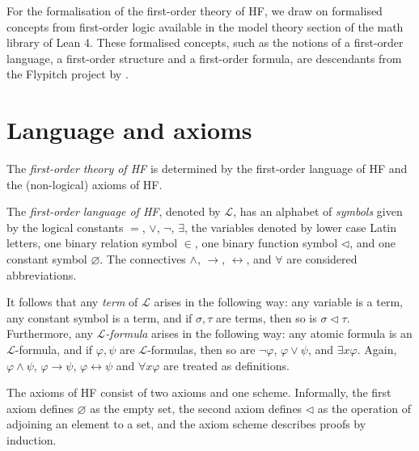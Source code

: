 For the formalisation of the first-order theory of HF,
we draw on formalised concepts from first-order logic available in 
the model theory section of the math library of Lean 4.
These formalised concepts, such as the notions of a first-order language,
a first-order structure and a first-order formula, are descendants from 
the Flypitch project by \cite{han2020formal}.

\section{Language and axioms}

The \textit{first-order theory of HF} is determined by the first-order language of HF and 
the (non-logical) axioms of HF.

\begin{definition}
    \label{def:Lang}
    \leanok
    The \textit{first-order language of HF}, denoted by $\mathcal{L}$, 
    has an alphabet of \textit{symbols} given by the 
    logical constants $=$, $\lor$, $\neg$, $\exists$, the variables denoted by 
    lower case Latin letters, one binary relation symbol $\in$, one binary function symbol $\lhd$, 
    and one constant symbol $\varnothing$.
    The connectives $\land$, $\rightarrow$, $\leftrightarrow$, and $\forall$ are considered 
    abbreviations.
\end{definition}

It follows that any \textit{term} of $\mathcal{L}$ arises in the following way:
any variable is a term, any constant symbol is a term, and if $\sigma, \tau$ are terms, then so is
$\sigma \lhd \tau$.
Furthermore, any \textit{$\mathcal{L}$-formula} arises in the following way:
any atomic formula is an $\mathcal{L}$-formula, and if $\varphi, \psi$ are $\mathcal{L}$-formulas, 
then so are $\neg \varphi$, $\varphi \lor \psi$, and $\exists x \varphi$.
Again, $\varphi \land \psi$, $\varphi \rightarrow \psi$, $\varphi \leftrightarrow \psi$ and
$\forall x \varphi$ are treated as definitions.

The axioms of HF consist of two axioms and one scheme. 
Informally, the first axiom defines $\varnothing$ as the
empty set, the second axiom defines $\lhd$ as the operation of adjoining an element to a set,
and the axiom scheme describes proofs by induction.

